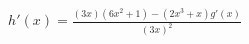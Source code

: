 \documentclass[preview]{standalone}
\begin{document}
\begin{align*}
h'(x) = \frac{(3x)(6x^2+1)-(2x^3+x)g'(x)}{(3x)^2}
\end{align*}
\end{document}
